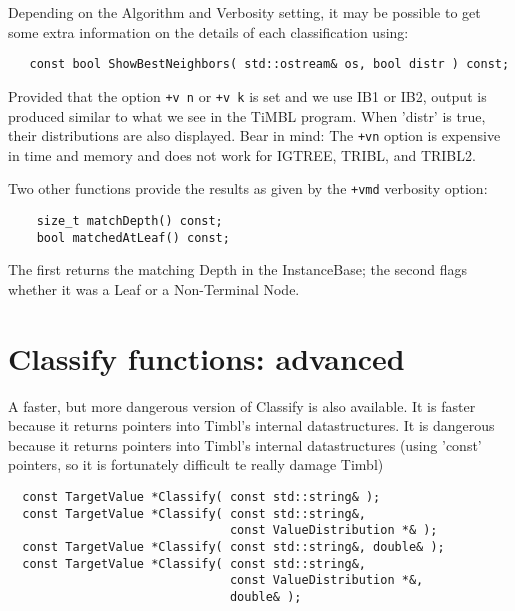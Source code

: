 \documentclass{report}
\begin{document}
Depending on the Algorithm and Verbosity setting, it may be possible
to get some extra information on the details of each classification
using:

\begin{footnotesize}
\begin{verbatim}
   const bool ShowBestNeighbors( std::ostream& os, bool distr ) const;
\end{verbatim}
\end{footnotesize}

Provided that the option {\tt +v n} or {\tt +v k} is set and we use
IB1 or IB2, output is produced similar to what we see in the TiMBL
program.  When 'distr' is true, their distributions are also
displayed.  Bear in mind: The {\tt +vn} option is expensive in time
and memory and does not work for IGTREE, TRIBL, and TRIBL2.

Two other functions provide the results as given by the {\tt +vmd} verbosity 
option:

\begin{footnotesize}
\begin{verbatim}
    size_t matchDepth() const;
    bool matchedAtLeaf() const;
\end{verbatim}
\end{footnotesize}

The first returns the matching Depth in the InstanceBase; the second 
flags whether it was a Leaf or a Non-Terminal Node.

\section{Classify functions: advanced}

A faster, but more dangerous version of Classify is also available.
It is faster because it returns pointers into Timbl's internal
datastructures. It is dangerous because it returns pointers into
Timbl's internal datastructures (using 'const' pointers, so it is
fortunately difficult te really damage Timbl)

\begin{footnotesize}
\begin{verbatim}
  const TargetValue *Classify( const std::string& );
  const TargetValue *Classify( const std::string&, 
                               const ValueDistribution *& );
  const TargetValue *Classify( const std::string&, double& );
  const TargetValue *Classify( const std::string&, 
                               const ValueDistribution *&, 
                               double& );
\end{verbatim}
\end{footnotesize}
\end{document}
